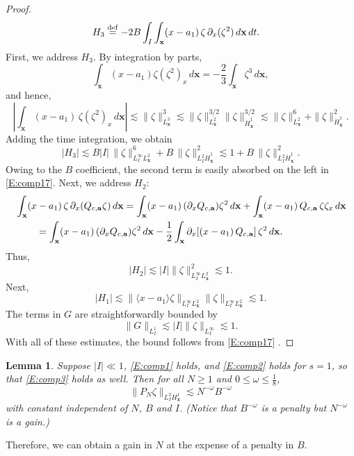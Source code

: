 \documentclass[12pt,letterpaper]{amsart}
\newcommand{\indentalign}{\hspace{0.3in}&\hspace{-0.3in}}
\newcommand{\la}{\langle}
\newcommand{\ra}{\rangle}
\newcommand{\defeq}{\stackrel{\rm{def}}{=}}
\newtheorem{lemma}[theorem]{Lemma}
\theoremstyle{remark}
\numberwithin{equation}{section}
\numberwithin{theorem}{section}
\numberwithin{table}{section}
\begin{document}
\begin{proof}
\begin{align*}
H_3 &\defeq - 2 B \int_I \int_{\mathbf{x}} (x-a_1) \,  \zeta \, \partial_x  ( \zeta^2) \, d \mathbf{x} \, dt.
\end{align*}
First, we address $H_3$.  By integration by parts,
$$
\int_{\mathbf{x}} (x-a_1) \zeta (\zeta^2)_x \, d\mathbf{x} = - \frac{2}{3}\int_{\mathbf{x}} \zeta^3 \, d\mathbf{x},
$$
and hence,
$$
\left| \int_{\mathbf{x}} (x-a_1) \, \zeta (\zeta^2)_x \, d\mathbf{x} \right| \lesssim \| \zeta\|_{L_{\mathbf{x}}^3}^3 \lesssim \| \zeta \|_{L^2_{\mathbf{x}}}^{3/2}  \| \zeta \|_{\dot H^1_{\mathbf{x}}}^{3/2} \lesssim \|\zeta\|_{L_{\mathbf{x}}^2}^6 + \|\zeta \|_{\dot H_{\mathbf{x}}^1}^2.
$$
Adding the time integration, we obtain
$$
|H_3| \lesssim B |I| \, \|\zeta\|_{L_I^\infty L_{\mathbf{x}}^2}^6
+ B \, \|\zeta \|_{L_I^2 \dot H_{\mathbf{x}}^1}^2 \lesssim 1
+ B \, \|\zeta \|_{L_I^2 \dot H_{\mathbf{x}}^1}^2.
$$
Owing to the $B$ coefficient, the second term is easily absorbed on the left in \eqref{E:comp17}.   Next, we address $H_2$:  
\begin{align*}
\indentalign \int_{\mathbf{x}} (x-a_1) \,  \zeta \, \partial_x  ( Q_{c,\mathbf{a}} \zeta) \, d\mathbf{x}  = \int_{\mathbf{x}} (x-a_1) \,  (\partial_xQ_{c,\mathbf{a}}) \zeta^2 \, d\mathbf{x} + \int_{\mathbf{x}} (x-a_1) \,   Q_{c,\mathbf{a}} \, \zeta \zeta_x \, d\mathbf{x}\\
& = \int_{\mathbf{x}} (x-a_1) \,  (\partial_xQ_{c,\mathbf{a}}) \zeta^2 \, d\mathbf{x} -\frac12 \int_{\mathbf{x}} \partial_x[(x-a_1) \,   Q_{c,\mathbf{a}}] \, \zeta^2 \, d\mathbf{x}.
\end{align*}
Thus,
$$
|H_2| \lesssim |I| \|\zeta\|_{L_I^\infty L_{\mathbf{x}}^2}^2 \lesssim 1.
$$
Next,
$$
|H_1| \lesssim \|\la x-a_1 \ra \zeta \|_{L_I^\infty L_{\mathbf{x}}^2} \| \zeta \|_{L_I^\infty L_{\mathbf{x}}^2} \lesssim 1.
$$
The terms in $G$ are straightforwardly bounded by 
$$
\|G\|_{L_I^1} \lesssim |I| \|\zeta\|_{L_I^\infty} \lesssim 1.
$$
With all of these estimates, the bound follows from \eqref{E:comp17} .
\end{proof}


\begin{lemma}
\label{L:comp2}
Suppose $|I| \ll 1$, \eqref{E:comp1} holds, and \eqref{E:comp2} holds for $s=1$, so that \eqref{E:comp3} holds as well.  Then for all $N\geq 1$ and $0\leq \omega \leq \frac18$,
\begin{equation}
\label{E:comp4}
\| P_N \zeta \|_{L_I^2 H_{\mathbf{x}}^1} \lesssim  N^{-\omega} B^{-\omega}
\end{equation}
with constant independent of $N$, $B$ and $I$.  (Notice that $B^{-\omega}$ is a penalty but $N^{-\omega}$ is a gain.)
\end{lemma}
Therefore, we can obtain a gain in $N$ at the expense of a penalty in $B$.
\end{document}
